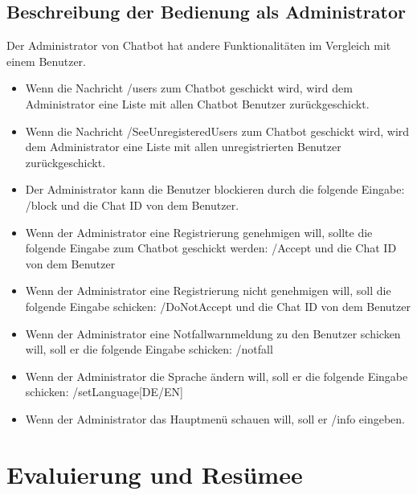 \subsection{Beschreibung der Bedienung als Administrator}
Der Administrator von Chatbot hat andere Funktionalitäten im Vergleich mit einem Benutzer. 
\begin{itemize}
	\item Wenn die Nachricht /users zum Chatbot geschickt wird, wird dem Administrator eine Liste mit allen Chatbot Benutzer zurückgeschickt.
\end{itemize}
\begin{itemize}
	\item Wenn die Nachricht /SeeUnregisteredUsers zum Chatbot geschickt wird, wird dem Administrator eine Liste mit allen unregistrierten Benutzer zurückgeschickt.
\end{itemize}
\begin{itemize}
	\item Der Administrator kann die Benutzer blockieren durch die folgende Eingabe: /block und die Chat ID von dem Benutzer. 
\end{itemize}
\begin{itemize}
	\item Wenn der Administrator eine Registrierung genehmigen will, sollte die folgende Eingabe zum Chatbot geschickt werden: /Accept und die Chat ID von dem Benutzer
\end{itemize}
\begin{itemize}
	\item Wenn der Administrator eine Registrierung nicht genehmigen will, soll die folgende Eingabe schicken: /DoNotAccept und die Chat ID von dem Benutzer
\end{itemize}
\begin{itemize}
	\item Wenn der Administrator eine Notfallwarnmeldung zu den Benutzer schicken will, soll er die folgende Eingabe schicken: /notfall
\end{itemize}
\begin{itemize}
	\item Wenn der Administrator die Sprache \"andern will, soll er die folgende Eingabe schicken: /setLanguage[DE/EN]
\end{itemize}
\begin{itemize}
	\item Wenn der Administrator das Hauptmen\"u schauen will, soll er /info eingeben.
\end{itemize}
\section{Evaluierung und Resümee}
